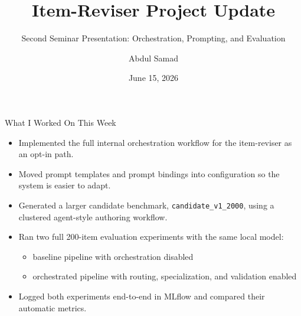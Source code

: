 \documentclass[aspectratio=169]{beamer}
\title{Item-Reviser Project Update}
\subtitle{Second Seminar Presentation: Orchestration, Prompting, and Evaluation}
\author{Abdul Samad}
\date{June 15, 2026}
\begin{document}
\begin{frame}
  \titlepage
\end{frame}

\begin{frame}{What I Worked On This Week}
  \begin{itemize}
    \item Implemented the full internal orchestration workflow for the item-reviser as an opt-in path.
    \item Moved prompt templates and prompt bindings into configuration so the system is easier to adapt.
    \item Generated a larger candidate benchmark, \texttt{candidate\_v1\_2000}, using a clustered agent-style authoring workflow.
    \item Ran two full 200-item evaluation experiments with the same local model:
    \begin{itemize}
      \item baseline pipeline with orchestration disabled
      \item orchestrated pipeline with routing, specialization, and validation enabled
    \end{itemize}
    \item Logged both experiments end-to-end in MLflow and compared their automatic metrics.
  \end{itemize}
\end{frame}
\end{document}
